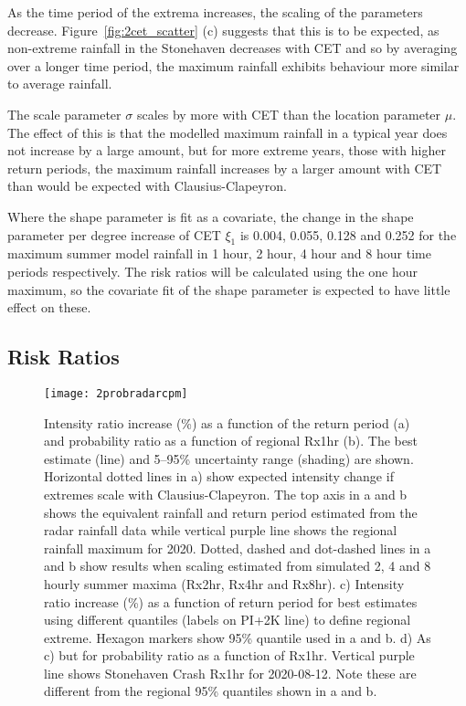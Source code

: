 As the time period of the extrema increases,
    the scaling of the parameters decrease.
Figure~\ref{fig:2cet_scatter} (c) suggests that this is to be expected,
    as non-extreme rainfall in the Stonehaven decreases with CET and so by averaging over a longer time period,
    the maximum rainfall exhibits behaviour more similar to average rainfall.

The scale parameter $\sigma$ scales by more with CET than the location parameter $\mu$.
The effect of this is that the modelled maximum rainfall in a typical year does not increase by a large amount,
    but for more extreme years, those with higher return periods,
    the maximum rainfall increases by a larger amount with CET than would be expected with Clausius-Clapeyron.

Where the shape parameter is fit as a covariate,
    the change in the shape parameter per degree increase of CET $\xi_1$ is
    0.004, 0.055, 0.128 and 0.252 for the maximum summer model rainfall in
    1 hour, 2 hour, 4 hour and 8 hour time periods respectively.
The risk ratios will be calculated using the one hour maximum,
    so the covariate fit of the shape parameter is expected to have little effect on these.

\subsection{Risk Ratios}\label{subsec:riskratio}

\begin{figure}[H]
    \centering
    \texttt{[image: 2probradarcpm]}
    \caption{Intensity ratio increase (\%) as a function of the return period (a) and
    probability ratio as a function of regional Rx1hr (b).
    The best estimate (line) and 5--95\% uncertainty range (shading) are shown.
    Horizontal dotted lines in a) show expected intensity change if extremes scale with Clausius-Clapeyron.
    The top axis in a and b shows the equivalent rainfall and return period estimated from the radar rainfall data while
    vertical purple line shows the regional rainfall maximum for 2020.
    Dotted, dashed and dot-dashed lines in a and b show results when scaling estimated from simulated 2, 4 and 8 hourly summer maxima (Rx2hr, Rx4hr and Rx8hr).
    c) Intensity ratio increase (\%) as a function of return period for best estimates using different quantiles (labels on PI+2K line) to define regional extreme.
    Hexagon markers show 95\% quantile used in a and b.
    d) As c) but for probability ratio as a function of Rx1hr.
    Vertical purple line shows Stonehaven Crash Rx1hr for 2020-08-12.
    Note these are different from the regional 95\% quantiles shown in a and b.}
    \label{fig:2probradarcpm}
\end{figure}

